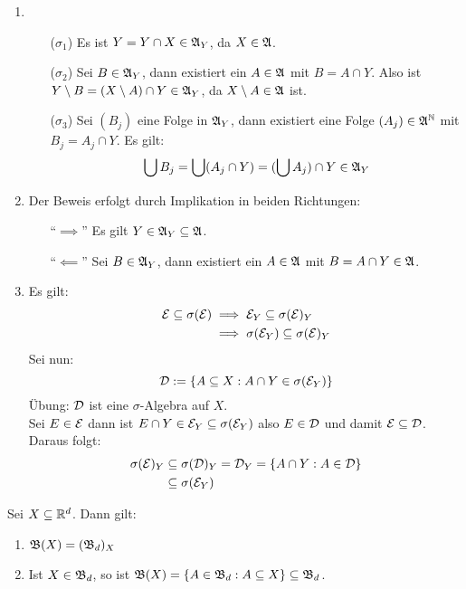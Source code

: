 \documentclass[a4paper,twoside,DIV15,BCOR12mm,chapterprefix=true,headings=onelinechapter]{scrbook}
\begin{document}
\begin{beweis}
\begin{enumerate}
\item \begin{enumerate}
\item[($\sigma_1$)] Es ist $Y=Y\cap X\in\mathfrak{A}_Y$, da $X\in\mathfrak{A}$.
\item[($\sigma_2$)] Sei $B\in\mathfrak{A}_Y$, dann existiert ein $A\in\mathfrak{A}$ mit $B=A\cap Y$. Also ist $Y\setminus B=(X\setminus A)\cap Y\in\mathfrak{A}_Y$, da $X\setminus A\in\mathfrak{A}$ ist.
\item[($\sigma_3$)] Sei $(B_j)$ eine Folge in $\mathfrak{A}_Y$, dann existiert eine Folge $(A_j)\in\mathfrak{A}^{\mathbb{N}}$ mit $B_j=A_j\cap Y$. Es gilt:
\[\bigcup B_j=\bigcup(A_j\cap Y)=(\bigcup A_j)\cap Y\in\mathfrak{A}_Y\]
\end{enumerate}
\item Der Beweis erfolgt durch Implikation in beiden Richtungen:
\begin{enumerate}
\item["`$\implies$"'] Es gilt $Y\in\mathfrak{A}_Y\subseteq\mathfrak{A}$.
\item["`$\impliedby$"'] Sei $B\in\mathfrak{A}_Y$, dann existiert ein $A\in\mathfrak{A}$ mit $B=A\cap Y\in\mathfrak{A}$.
\end{enumerate}
\item Es gilt:
\begin{align*}
\mathcal{E}\subseteq\sigma(\mathcal{E})&\implies\mathcal{E}_Y\subseteq\sigma(\mathcal{E})_Y\\
&\implies\sigma(\mathcal{E}_Y)\subseteq\sigma(\mathcal{E})_Y
\end{align*}
Sei nun:
\[\mathcal{D}:=\{A\subseteq X:A\cap Y\in\sigma(\mathcal{E}_Y)\}\]
Übung: $\mathcal{D}$ ist eine $\sigma$-Algebra auf $X$.\\
Sei $E\in\mathcal{E}$ dann ist $E\cap Y\in\mathcal{E}_Y\subseteq\sigma(\mathcal{E}_Y)$ also $E\in\mathcal{D}$ und damit $\mathcal{E}\subseteq\mathcal{D}$. Daraus folgt:
\begin{align*}
\sigma(\mathcal{E})_Y&\subseteq\sigma(\mathcal{D})_Y=\mathcal{D}_Y=\{A\cap Y:A\in\mathcal{D}\}\\
&\subseteq\sigma(\mathcal{E}_Y)
\end{align*}
\end{enumerate}
\end{beweis}

\begin{folgerungen}
Sei $X\subseteq\mathbb{R}^d$. Dann gilt:
\begin{enumerate}
\item $\mathfrak{B}(X)=(\mathfrak{B}_d)_X$
\item Ist $X\in\mathfrak{B}_d$, so ist $\mathfrak{B}(X)=\{A\in\mathfrak{B}_d:A\subseteq X\}\subseteq\mathfrak{B}_d$.
\end{enumerate}
\end{folgerungen}
\end{document}
